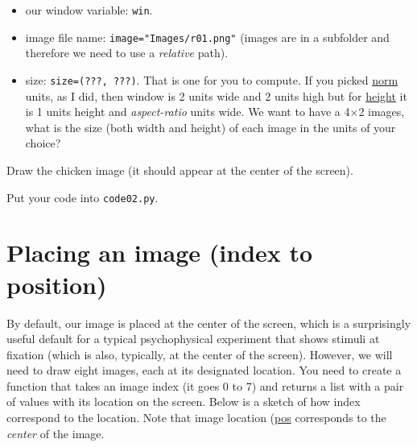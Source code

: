\documentclass[
]{book}
\providecommand{\tightlist}{%
  \setlength{\itemsep}{0pt}\setlength{\parskip}{0pt}}
\begin{document}
\begin{itemize}
\tightlist
\item
  our window variable: \texttt{win}.
\item
  image file name: \texttt{image="Images/r01.png"} (images are in a subfolder and therefore we need to use a \emph{relative} path).
\item
  size: \texttt{size=(???,\ ???)}. That is one for you to compute. If you picked \protect\hyperlink{psychopy-units-norm}{norm} units, as I did, then window is 2 units wide and 2 units high but for \protect\hyperlink{psychopy-units-height}{height} it is 1 units height and \emph{aspect-ratio} units wide. We want to have a 4×2 images, what is the size (both width and height) of each image in the units of your choice?
\end{itemize}

Draw the chicken image (it should appear at the center of the screen).

Put your code into \texttt{code02.py}.

\hypertarget{placing-an-image-index-to-position}{%
\section{Placing an image (index to position)}\label{placing-an-image-index-to-position}}

By default, our image is placed at the center of the screen, which is a surprisingly useful default for a typical psychophysical experiment that shows stimuli at fixation (which is also, typically, at the center of the screen). However, we will need to draw eight images, each at its designated location. You need to create a function that takes an image index (it goes 0 to 7) and returns a list with a pair of values with its location on the screen. Below is a sketch of how index correspond to the location. Note that image location (\href{https://psychopy.org/api/visual/imagestim.html\#psychopy.visual.ImageStim.pos\%20attribute}{pos} corresponds to the \emph{center} of the image.
\end{document}
